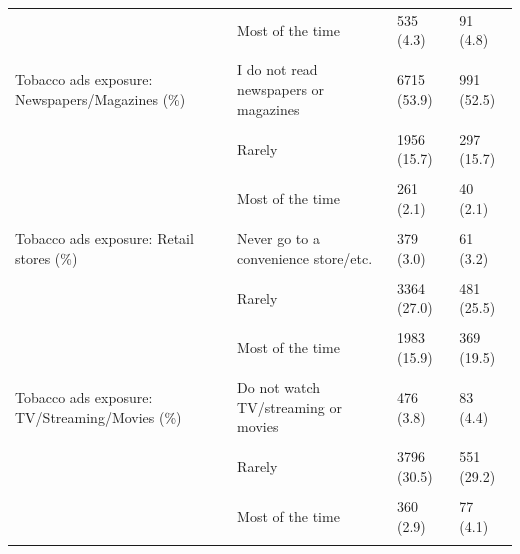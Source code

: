 \begin{longtable}[t]{>{\raggedright\arraybackslash}p{4.5cm}>{\raggedright\arraybackslash}p{5cm}ll}
 & Most of the time & 535 (4.3) & 91 (4.8)\\
\cellcolor{gray!6}{} & \cellcolor{gray!6}{Always} & \cellcolor{gray!6}{216 (1.7)} & \cellcolor{gray!6}{28 (1.5)}\\
Tobacco ads exposure: Newspapers/Magazines (\%) & I do not read newspapers or magazines & 6715 (53.9) & 991 (52.5)\\
\cellcolor{gray!6}{} & \cellcolor{gray!6}{Never} & \cellcolor{gray!6}{2326 (18.7)} & \cellcolor{gray!6}{382 (20.2)}\\
\addlinespace
 & Rarely & 1956 (15.7) & 297 (15.7)\\
\cellcolor{gray!6}{} & \cellcolor{gray!6}{Sometimes} & \cellcolor{gray!6}{1074 (8.6)} & \cellcolor{gray!6}{161 (8.5)}\\
 & Most of the time & 261 (2.1) & 40 (2.1)\\
\cellcolor{gray!6}{} & \cellcolor{gray!6}{Always} & \cellcolor{gray!6}{122 (1.0)} & \cellcolor{gray!6}{17 (0.9)}\\
Tobacco ads exposure: Retail stores (\%) & Never go to a convenience store/etc. & 379 (3.0) & 61 (3.2)\\
\addlinespace
\cellcolor{gray!6}{} & \cellcolor{gray!6}{Never} & \cellcolor{gray!6}{2686 (21.6)} & \cellcolor{gray!6}{286 (15.1)}\\
 & Rarely & 3364 (27.0) & 481 (25.5)\\
\cellcolor{gray!6}{} & \cellcolor{gray!6}{Sometimes} & \cellcolor{gray!6}{3079 (24.7)} & \cellcolor{gray!6}{503 (26.6)}\\
 & Most of the time & 1983 (15.9) & 369 (19.5)\\
\cellcolor{gray!6}{} & \cellcolor{gray!6}{Always} & \cellcolor{gray!6}{963 (7.7)} & \cellcolor{gray!6}{188 (10.0)}\\
\addlinespace
Tobacco ads exposure: TV/Streaming/Movies (\%) & Do not watch TV/streaming or movies & 476 (3.8) & 83 (4.4)\\
\cellcolor{gray!6}{} & \cellcolor{gray!6}{Never} & \cellcolor{gray!6}{5715 (45.9)} & \cellcolor{gray!6}{814 (43.1)}\\
 & Rarely & 3796 (30.5) & 551 (29.2)\\
\cellcolor{gray!6}{} & \cellcolor{gray!6}{Sometimes} & \cellcolor{gray!6}{1928 (15.5)} & \cellcolor{gray!6}{333 (17.6)}\\
 & Most of the time & 360 (2.9) & 77 (4.1)\\
\addlinespace
\cellcolor{gray!6}{} & \cellcolor{gray!6}{Always} & \cellcolor{gray!6}{179 (1.4)} & \cellcolor{gray!6}{30 (1.6)}\\

\end{longtable}
